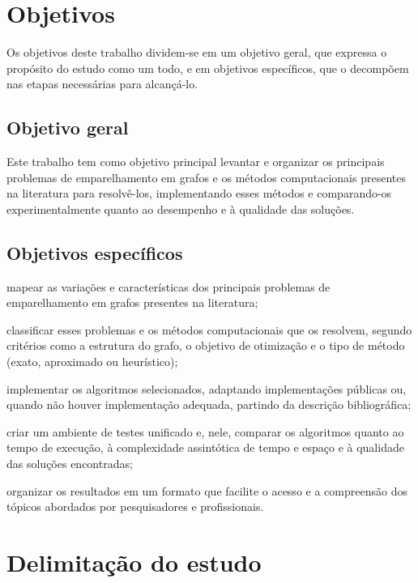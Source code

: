 \section{Objetivos}

Os objetivos deste trabalho dividem-se em um objetivo geral, que expressa o propósito do estudo como um todo, e em objetivos específicos, que o decompõem nas etapas necessárias para alcançá-lo.

\subsection{Objetivo geral}

Este trabalho tem como objetivo principal levantar e organizar os principais problemas de emparelhamento em grafos e os métodos computacionais presentes na literatura para resolvê-los, implementando esses métodos e comparando-os experimentalmente quanto ao desempenho e à qualidade das soluções.

\subsection{Objetivos específicos}

\begin{alineas}
    \item mapear as variações e características dos principais problemas de emparelhamento em grafos presentes na literatura;
    \item classificar esses problemas e os métodos computacionais que os resolvem, segundo critérios como a estrutura do grafo, o objetivo de otimização e o tipo de método (exato, aproximado ou heurístico);
    \item implementar os algoritmos selecionados, adaptando implementações públicas ou, quando não houver implementação adequada, partindo da descrição bibliográfica;
    \item criar um ambiente de testes unificado e, nele, comparar os algoritmos quanto ao tempo de execução, à complexidade assintótica de tempo e espaço e à qualidade das soluções encontradas;
    \item organizar os resultados em um formato que facilite o acesso e a compreensão dos tópicos abordados por pesquisadores e profissionais.
\end{alineas}

\section{Delimitação do estudo}
\label{sec:delimitacao}

